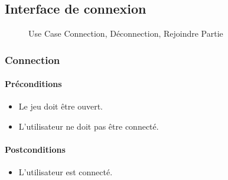 \documentclass[a4paper,11pt]{report}
\begin{document}
\subsection{Interface de connexion}
\begin{figure}[ht]
    \caption{Use Case Connection, Déconnection, Rejoindre Partie}
\end{figure}
\newpage
\subsubsection{Connection}
\paragraph{Préconditions}
\begin{itemize}
 \item Le jeu doit être ouvert.
 \item L'utilisateur ne doit pas être connecté.
\end{itemize}
\paragraph{Postconditions}
\begin{itemize}
 \item L'utilisateur est connecté.
\end{itemize}
\end{document}
